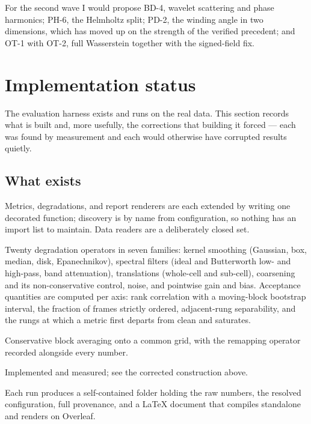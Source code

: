 \documentclass[11pt]{article}
\begin{document}
\noindent
For the second wave I would propose BD-4, wavelet scattering and phase harmonics; PH-6, the
Helmholtz split; PD-2, the winding angle in two dimensions, which has moved up on the
strength of the verified precedent; and OT-1 with OT-2, full Wasserstein together with the
signed-field fix.

\section{Implementation status}
\label{sec:implementation}

The evaluation harness exists and runs on the real data. This section records what is built
and, more usefully, the corrections that building it forced --- each was found by measurement
and each would otherwise have corrupted results quietly.

\subsection{What exists}

\begin{description}[leftmargin=*,style=nextline]
\item[Three plugin registries.] Metrics, degradations, and report renderers are each
extended by writing one decorated function; discovery is by name from configuration, so
nothing has an import list to maintain. Data readers are a deliberately closed set.
\item[The ladder (IN-3).] Twenty degradation operators in seven families: kernel smoothing
(Gaussian, box, median, disk, Epanechnikov), spectral filters (ideal and Butterworth
low- and high-pass, band attenuation), translations (whole-cell and sub-cell), coarsening
and its non-conservative control, noise, and pointwise gain and bias. Acceptance quantities
are computed per axis: rank correlation with a moving-block bootstrap interval, the fraction
of frames strictly ordered, adjacent-rung separability, and the rungs at which a metric first
departs from clean and saturates.
\item[The analysis grid (IN-2).] Conservative block averaging onto a common grid, with the
remapping operator recorded alongside every number.
\item[The canary (IN-4).] Implemented and measured; see the corrected construction above.
\item[Reporting.] Each run produces a self-contained folder holding the raw numbers, the
resolved configuration, full provenance, and a \LaTeX{} document that compiles standalone and
renders on Overleaf.
\end{description}
\end{document}
